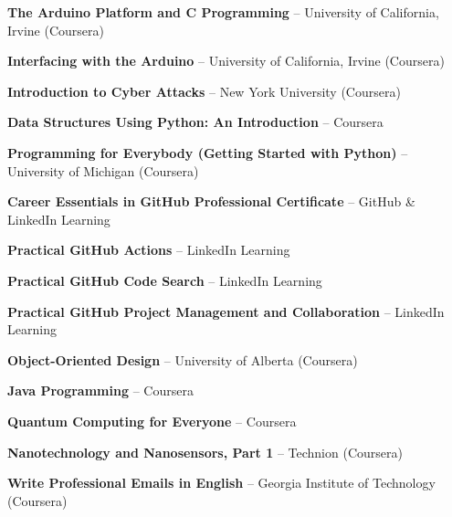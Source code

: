 \documentclass[a4paper,11pt]{article}
\begin{document}
\begin{itemize}[leftmargin=0in, label={}]

\small{

\item{
\textbf{The Arduino Platform and C Programming} -- University of California, Irvine (Coursera)
}

\item{
\textbf{Interfacing with the Arduino} -- University of California, Irvine (Coursera)
}

\item{
\textbf{Introduction to Cyber Attacks} -- New York University (Coursera)
}

\item{
\textbf{Data Structures Using Python: An Introduction} -- Coursera
}

\item{
\textbf{Programming for Everybody (Getting Started with Python)} -- University of Michigan (Coursera)
}

\item{
\textbf{Career Essentials in GitHub Professional Certificate} -- GitHub \& LinkedIn Learning
}

\item{
\textbf{Practical GitHub Actions} -- LinkedIn Learning
}

\item{
\textbf{Practical GitHub Code Search} -- LinkedIn Learning
}

\item{
\textbf{Practical GitHub Project Management and Collaboration} -- LinkedIn Learning
}

\item{
\textbf{Object-Oriented Design} -- University of Alberta (Coursera)
}

\item{
\textbf{Java Programming} -- Coursera
}

\item{
\textbf{Quantum Computing for Everyone} -- Coursera
}

\item{
\textbf{Nanotechnology and Nanosensors, Part 1} -- Technion (Coursera)
}

\item{
\textbf{Write Professional Emails in English} -- Georgia Institute of Technology (Coursera)
}

}

\end{itemize}
\end{document}
